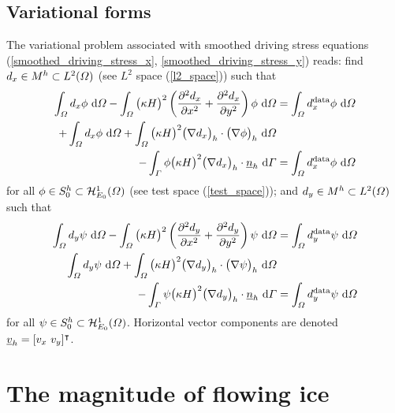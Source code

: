\subsection{Variational forms}

The variational problem associated with smoothed driving stress equations (\ref{smoothed_driving_stress_x}, \ref{smoothed_driving_stress_y}) reads: find $d_x \in \ltwospace$ (see $L^2$ space (\ref{l2_space})) such that
\begin{align*}
  \int_{\Omega} d_x \phi \d{\Omega} - \int_{\Omega} \big( \kappa H \big)^2 \left( \parder[2]{d_x}{x} + \parder[2]{d_x}{y} \right) \phi \d{\Omega} &= \int_{\Omega} d_x^{\text{data}} \phi \d{\Omega} \\
  + \int_{\Omega} d_x \phi \d{\Omega} + \int_{\Omega} \big( \kappa H \big)^2 \big( \nabla d_x \big)_h \cdot \big( \nabla \phi \big)_h \d{\Omega} &\\
  - \int_{\Gamma} \phi \big( \kappa H \big)^2 \big( \nabla d_x \big)_h \cdot \rankone{n}_h \d{\Gamma} &= \int_{\Omega} d_x^{\text{data}} \phi \d{\Omega}
\end{align*}
for all $\phi \in \testspace$ (see test space (\ref{test_space})); and $d_y \in \ltwospace$ such that
\begin{align*}
  \int_{\Omega} d_y \psi \d{\Omega} - \int_{\Omega} \big( \kappa H \big)^2 \left( \parder[2]{d_y}{x} + \parder[2]{d_y}{y} \right) \psi \d{\Omega} &= \int_{\Omega} d_y^{\text{data}} \psi \d{\Omega} \\
  \int_{\Omega} d_y \psi \d{\Omega} + \int_{\Omega} \big( \kappa H \big)^2 \big( \nabla d_y \big)_h \cdot \big( \nabla \psi \big)_h \d{\Omega} &\\
  - \int_{\Gamma} \psi \big( \kappa H \big)^2 \big( \nabla d_y \big)_h \cdot \rankone{n}_h \d{\Gamma} &= \int_{\Omega} d_y^{\text{data}} \psi \d{\Omega}
\end{align*}
for all $\psi \in \testspace$.  Horizontal vector components are denoted $\rankone{v}_h = [v_x\ v_y]\T$.

\section{The magnitude of flowing ice}

